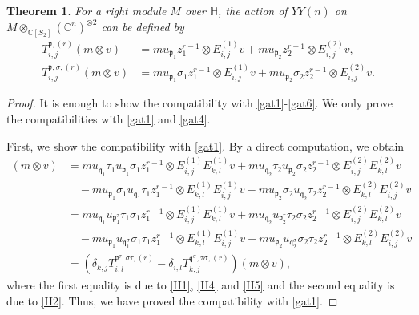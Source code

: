 \documentclass{article}
\newtheorem{Theorem}[equation]{Theorem}
\theoremstyle{definition}
\theoremstyle{remark}
\numberwithin{equation}{section}
\numberwithin{equation}{section}
\begin{document}
\begin{Theorem}
For a right module $M$ over $\mathbb{H}$, the action of $YY(n)$ on $M\otimes_{\mathbb{C}[S_2]}(\mathbb{C}^n)^{\otimes2}$ can be defined by
\begin{align*}
T^{\mathfrak{p},(r)}_{i,j}(m\otimes v)&=mu_{\mathfrak{p}_1}z_1^{r-1}\otimes E^{(1)}_{i,j}v+mu_{\mathfrak{p}_2}z_2^{r-1}\otimes E^{(2)}_{i,j}v,\\
T^{\mathfrak{p},\sigma,(r)}_{i,j}(m\otimes v)&=mu_{\mathfrak{p}_1}\sigma_1z_1^{r-1}\otimes E^{(1)}_{i,j}v+mu_{\mathfrak{p}_2}\sigma_2z_2^{r-1}\otimes E^{(2)}_{i,j}v.
\end{align*}
\end{Theorem}
\begin{proof}
It is enough to show the compatibility with \eqref{gat1}-\eqref{gat6}. We only prove the compatibilities with \eqref{gat1} and \eqref{gat4}. 

First, we show the compatibility with \eqref{gat1}. By a direct computation, we obtain
\begin{align*}
[T^{\mathfrak{p},\sigma,(1)}_{i,j},T^{\mathfrak{q},\tau,(r)}_{k,l}](m\otimes v)
&=mu_{\mathfrak{q}_1}\tau_1u_{\mathfrak{p}_1}\sigma_1z_1^{r-1}\otimes E^{(1)}_{i,j}E^{(1)}_{k,l}v+mu_{\mathfrak{q}_2}\tau_2u_{\mathfrak{p}_2}\sigma_2z_2^{r-1}\otimes E^{(2)}_{i,j}E^{(2)}_{k,l}v\\
&\quad-mu_{\mathfrak{p}_1}\sigma_1u_{\mathfrak{q}_1}\tau_1z_1^{r-1}\otimes E^{(1)}_{k,l}E^{(1)}_{i,j}v-mu_{\mathfrak{p}_2}\sigma_2u_{\mathfrak{q}_2}\tau_2z_2^{r-1}\otimes E^{(2)}_{k,l}E^{(2)}_{i,j}v\\
&=mu_{\mathfrak{q}_1}u_{\mathfrak{p}^\tau_1}\tau_1\sigma_1z_1^{r-1}\otimes E^{(1)}_{i,j}E^{(1)}_{k,l}v+mu_{\mathfrak{q}_2}u_{\mathfrak{p}^\tau_2}\tau_2\sigma_2z_2^{r-1}\otimes E^{(2)}_{i,j}E^{(2)}_{k,l}v\\
&\quad-mu_{\mathfrak{p}_1}u_{\mathfrak{q}^\sigma_1}\sigma_1\tau_1z_1^{r-1}\otimes E^{(1)}_{k,l}E^{(1)}_{i,j}v-mu_{\mathfrak{p}_2}u_{\mathfrak{q}^\sigma_2}\sigma_2\tau_2z_2^{r-1}\otimes E^{(2)}_{k,l}E^{(2)}_{i,j}v\\
&=(\delta_{k,j}T^{\mathfrak{p}^\tau,\sigma\tau,(r)}_{i,l}-\delta_{i,l}T^{\mathfrak{q}^\sigma,\tau\sigma,(r)}_{k,j})(m\otimes v),
\end{align*}
where the first equality is due to \eqref{H1}, \eqref{H4} and \eqref{H5} and the second equality is due to \eqref{H2}. Thus, we have proved the compatibility with \eqref{gat1}.


\end{proof}
\end{document}
